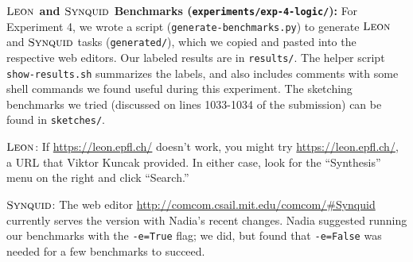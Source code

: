 \documentclass[acmsmall,nonacm]{acmart}
\newcommand{\leon}
  {\ensuremath{\textsc{Leon}}}
\newcommand{\synquid}
  {\ensuremath{\textsc{Synquid}}}
\begin{document}
\vspace{0.30in}
%
\noindent
%
\textbf{\leon{} and \synquid{} Benchmarks (\texttt{experiments/exp-4-logic/}):}
%
For Experiment 4, we wrote a script
%
(\texttt{generate-benchmarks.py})
%
to generate \leon{} and \synquid{} tasks
%
(\texttt{generated/}),
%
which we copied and pasted into the respective web editors.
%
Our labeled results are in \texttt{results/}.
%
The helper script \texttt{show-results.sh} summarizes the labels,
and also includes comments with some shell commands we found useful during
this experiment.
%
The sketching benchmarks we tried (discussed on lines 1033-1034 of the
submission) can be found in \texttt{sketches/}.

\leon{}: If \url{https://leon.epfl.ch/} doesn't work, you might try
\url{https://leon.epfl.ch/}, a URL that Viktor Kuncak provided. In either case,
look for the ``Synthesis'' menu on the right and click ``Search.''

\synquid{}: The web editor \url{http://comcom.csail.mit.edu/comcom/#Synquid}
currently serves the version with Nadia's recent changes. Nadia suggested
running our benchmarks with the \texttt{-e=True} flag; we did, but found that
\texttt{-e=False} was needed for a few benchmarks to succeed.

\clearpage

\setcounter{figure}{9}

\setcounter{figure}{0}





\end{document}
